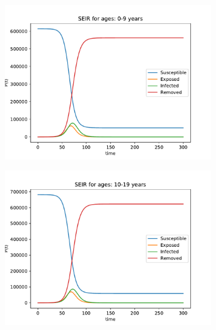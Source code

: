 \begin{figure}[H]
\centering
\begin{subfigure}{0.40\textwidth}
\includegraphics[width = \textwidth]{../fig/SEIR_0-9_q.pdf}
\caption{\protect}
\end{subfigure}
\begin{subfigure}{0.40\textwidth}
\includegraphics[width = \textwidth]{../fig/SEIR_10-19_q.pdf}
\caption{\protect}
\end{subfigure}
\begin{subfigure}{0.40\textwidth}

\end{subfigure}
\end{figure}
